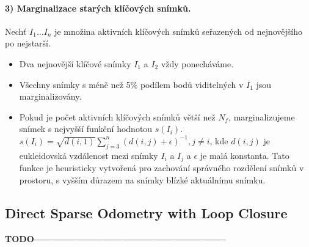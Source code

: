 \documentclass[12pt,a4paper]{article}
\begin{document}
\paragraph*{3) Marginalizace starých klíčových snímků.} Nechť \( I_1 \dots I_n \) je množina aktivních klíčových snímků seřazených od nejnovějšího po nejstarší.
\begin{itemize}
\item Dva nejnovější klíčové snímky \( I_1 \) a \( I_2 \) vždy ponecháváme.
\item Všechny snímky s méně než 5\% podílem bodů viditelných v \( I_1 \) jsou marginalizovány.
\item Pokud je počet aktivních klíčových snímků větší než \( N_f \), marginalizujeme snímek s nejvyšší funkční hodnotou \( s(I_i) \). \( s(I_i)=\sqrt{d(i,1)} \sum_{j=3}^n (d(i,j)+\epsilon)^{-1}, j\neq i \), kde \( d(i,j) \) je eukleidovská vzdálenost mezi snímky \( I_i \) a \( I_j \) a \( \epsilon \) je  malá konstanta. Tato funkce je heuristicky vytvořená pro zachování správného rozdělení snímků v prostoru, s vyšším důrazem na snímky blízké aktuálnímu snímku.
\end{itemize}



\subsection{Direct Sparse Odometry with Loop Closure}



\textsf{\textbf{TODO-----------------------------------------------------------}}



\end{document}
